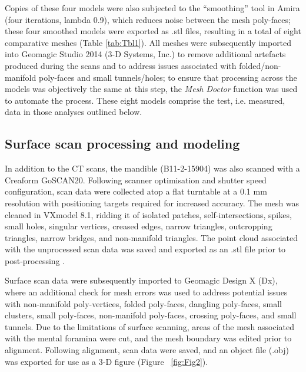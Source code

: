 \documentclass[review]{elsarticle}
\begin{document}
Copies of these four models were also subjected to the “smoothing” tool in Amira (four iterations, lambda 0.9), which reduces noise between the mesh poly-faces; these four smoothed models were exported as .stl files, resulting in a total of eight comparative meshes (Table \ref{tab:Tbl1}). All meshes were subsequently imported into Geomagic Studio 2014 (3-D Systems, Inc.) to remove additional artefacts produced during the scans and to address issues associated with folded/non-manifold poly-faces and small tunnels/holes; to ensure that processing across the models was objectively the same at this step, the \textit{Mesh Doctor} function was used to automate the process. These eight models comprise the test, i.e. measured, data in those analyses outlined below. 

\subsection*{Surface scan processing and modeling}

In addition to the CT scans, the mandible (B11-2-15904) was also scanned with a Creaform GoSCAN20. Following scanner optimisation and shutter speed configuration, scan data were collected atop a flat turntable at a 0.1 mm resolution with positioning targets required for increased accuracy. The mesh was cleaned in VXmodel 8.1, ridding it of isolated patches, self-intersections, spikes, small holes, singular vertices, creased edges, narrow triangles, outcropping triangles, narrow bridges, and non-manifold triangles. The point cloud associated with the unprocessed scan data was saved and exported as an .stl file prior to post-processing \citep{RN5585}. 

Surface scan data \citep{RN5931,RN5924} were subsequently imported to Geomagic Design X (Dx), where an additional check for mesh errors was used to address potential issues with non-manifold poly-vertices, folded poly-faces, dangling poly-faces, small clusters, small poly-faces, non-manifold poly-faces, crossing poly-faces, and small tunnels. Due to the limitations of surface scanning, areas of the mesh associated with the mental foramina were cut, and the mesh boundary was edited prior to alignment. Following alignment, scan data were saved, and an object file (.obj) was exported for use as a 3-D figure (Figure ~\ref{fig:Fig2}).
\end{document}
